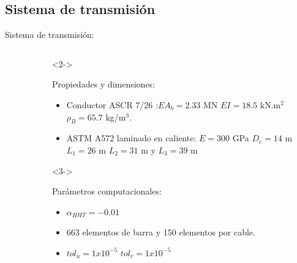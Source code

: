 \documentclass[
  aspectratio=169,
]{beamer}
\begin{document}
\begin{small}
\subsection[Sistema de transmisión]{Sistema de transmisión}
\begin{frame}[t]{Sistema de transmisión:}
	\begin{columns}[T,onlytextwidth]
		\begin{column}{.58\textwidth}
			\begin{minipage}{\textwidth}
				\begin{figure}[htbp]
					\centering
					\def\svgwidth{70mm}
					
				\end{figure}
			\end{minipage}  
		\end{column}
		\begin{column}{.4\textwidth}
			\begin{onlyenv}<2->
				\begin{minipage}{\textwidth}
					\vspace{-1cm}
					\begin{block}{Propiedades y dimensiones:}
						\begin{itemize}
							\item {\color{gray} Conductor ASCR 7/26  }:$EA_b= 2.33$ MN $EI= 18.5$ kN.m$^2$   $\rho_B=65.7$ kg/m$^3$.
							\item {\color{red} ASTM A572 laminado en caliente}:  $E= 300$ GPa $D_c= 14$ m  $L_1= 26$ m $L_2= 31$ m y $L_3= 39$ m  
						\end{itemize}	 
					\end{block}
				\end{minipage}
			\end{onlyenv}
			\begin{onlyenv}<3->
				\begin{minipage}{\textwidth}
					\begin{block}{Parámetros computacionales:}
						\begin{itemize}
							\item $\alpha_{HHT} = -0.01$
							\item 663 elementos de barra y 150 elementos por cable. 
							\item $tol_u =1$$x10^{-5} $ $tol_r =1x10^{-5} $   
$$
\end{itemize}
\end{block}
\end{minipage}
\end{onlyenv}
\end{column}
\end{columns}
\end{frame}
\end{small}
\end{document}

